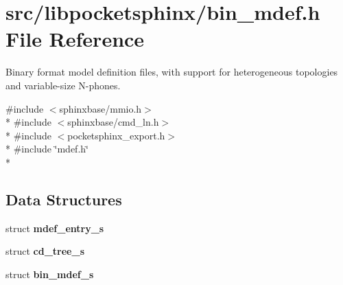 \section{src/libpocketsphinx/bin\-\_\-mdef.h File Reference}
\label{bin__mdef_8h}


Binary format model definition files, with support for heterogeneous topologies and variable-\/size N-\/phones.  


{\ttfamily \#include $<$sphinxbase/mmio.\-h$>$}\\*
{\ttfamily \#include $<$sphinxbase/cmd\-\_\-ln.\-h$>$}\\*
{\ttfamily \#include $<$pocketsphinx\-\_\-export.\-h$>$}\\*
{\ttfamily \#include \char`\"{}mdef.\-h\char`\"{}}\\*
\subsection*{Data Structures}
\begin{DoxyCompactItemize}
\item 
struct {\bf mdef\-\_\-entry\-\_\-s}
\item 
struct {\bf cd\-\_\-tree\-\_\-s}
\item 
struct {\bf bin\-\_\-mdef\-\_\-s}
\end{DoxyCompactItemize}
